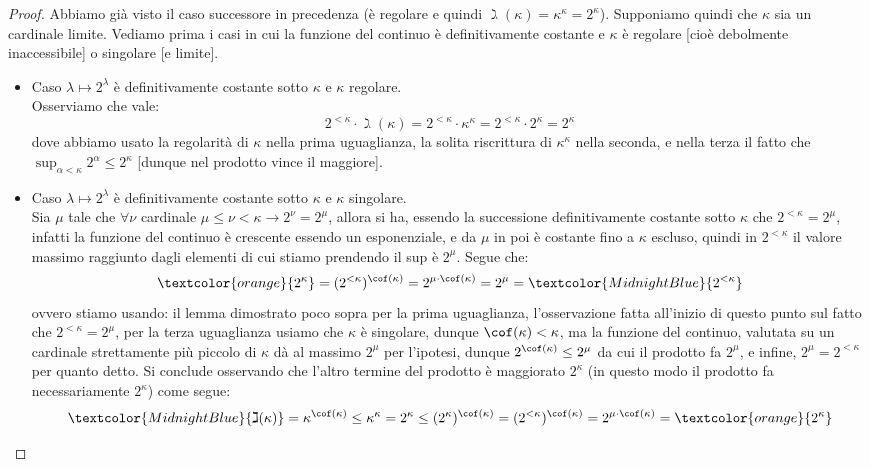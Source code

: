 \documentclass[11pt]{scrartcl}
\begin{document}
\begin{proof}
	Abbiamo già visto il caso successore in precedenza (è regolare e quindi $\gimel(\kappa) = \kappa^\kappa = 2^\kappa$). Supponiamo quindi che $\kappa$ sia un cardinale limite. Vediamo prima i casi in cui 
	la funzione del continuo è definitivamente costante e $\kappa$ è regolare [cioè debolmente inaccessibile] o singolare [e limite].
	\begin{itemize}
		\item Caso $\lambda \mapsto 2^\lambda$ è definitivamente costante sotto $\kappa$ e $\kappa$ regolare.\\
		Osserviamo che vale:
		\[ 2^{<\kappa} \cdot \gimel(\kappa) = 2^{<\kappa} \cdot \kappa^\kappa = 2^{<\kappa} \cdot 2^\kappa = 2^\kappa
			\]
		dove abbiamo usato la regolarità di $\kappa$ nella prima uguaglianza, la solita riscrittura di $\kappa^\kappa$ nella seconda,
		e nella terza il fatto che $\sup_{\alpha < \kappa} 2^\alpha \leq 2^\kappa$ [dunque nel prodotto vince il maggiore].
		\item Caso $\lambda \mapsto 2^\lambda$ è definitivamente costante sotto $\kappa$ e $\kappa$ singolare.\\
		Sia $\mu$ tale che $\forall \nu$ cardinale $\mu \leq \nu < \kappa \rightarrow 2^\nu = 2^\mu$, allora si ha, essendo la successione definitivamente costante sotto $\kappa$ che $2^{<\kappa} = 2^{\mu}$,
		infatti la funzione del continuo è crescente essendo un esponenziale, e da $\mu$ in poi è costante fino a $\kappa$ escluso, quindi in $2^{<\kappa}$ il valore massimo raggiunto dagli elementi di cui stiamo prendendo il sup è $2^\mu$.
		Segue che:
		\[ \textcolor{orange}{2^\kappa} = (2^{<\kappa})^{\cof(\kappa)} = 2^{\mu \cdot \cof(\kappa)} = 2^\mu = \textcolor{MidnightBlue}{2^{<\kappa}} 
			\]
		ovvero stiamo usando: il lemma dimostrato poco sopra per la prima uguaglianza, l'osservazione fatta all'inizio di questo punto sul fatto che $2^{<\kappa} = 2^\mu$, per la terza uguaglianza usiamo che $\kappa$ è singolare, dunque $\cof(\kappa) < \kappa$, ma la funzione del continuo, 
		valutata su un cardinale strettamente più piccolo di $\kappa$ dà al massimo $2^{\mu}$ per l'ipotesi, dunque $2^{\cof(\kappa)} \leq 2^\mu$ da cui il prodotto fa $2^\mu$, e infine, $2^\mu = 2^{<\kappa}$ per quanto detto.
		Si conclude osservando che l'altro termine del prodotto è maggiorato $2^\kappa$ (in questo modo il prodotto fa necessariamente $2^\kappa$) come segue:
		\[ \textcolor{MidnightBlue}{\gimel(\kappa)} = {\kappa}^{\cof(\kappa)} \leq \kappa^{\kappa} = 2^\kappa \leq (2^\kappa)^{\cof(\kappa)} = (2^{<\kappa})^{\cof(\kappa)} = 2^{\mu \cdot \cof(\kappa)} = \textcolor{orange}{2^{\kappa}}
\]
\end{itemize}
\end{proof}
\end{document}
